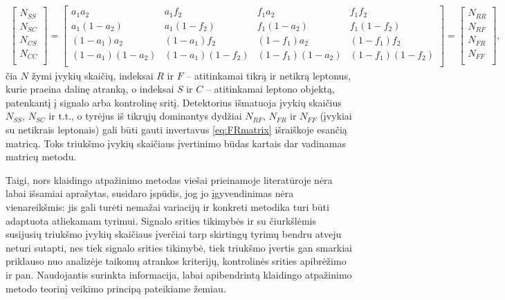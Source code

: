 \documentclass[a4paper, 12pt, oneside]{article}
\newlength\q
\begin{document}
\begin{align}
\label{eq:FRmatrix}
	\begin{bmatrix}
		N_{SS} \\		
		N_{SC} \\
		N_{CS} \\
		N_{CC} \\
	\end{bmatrix}
	=
	\begin{bmatrix}
		a_1a_2 & a_1f_2 & f_1a_2 & f_1f_2 \\
		a_1(1-a_2) & a_1(1-f_2) & f_1(1-a_2) & f_1(1-f_2) \\
		(1-a_1)a_2 & (1-a_1)f_2 & (1-f_1)a_2 & (1-f_1)f_2 \\
		(1-a_1)(1-a_2) & (1-a_1)(1-f_2) & (1-f_1)(1-a_2) & (1-f_1)(1-f_2) \\
	\end{bmatrix}
	=
	\begin{bmatrix}
		N_{RR} \\
		N_{RF} \\
		N_{FR} \\
		N_{FF} \\
	\end{bmatrix}
	\! ,
\end{align}
čia $N$ žymi įvykių skaičių, indeksai $R$ ir $F$ -- atitinkamai tikrą ir netikrą leptonus, kurie praeina dalinę atranką,
o indeksai $S$ ir $C$ -- atitinkamai leptono objektą, patenkantį į signalo arba kontrolinę sritį.
Detektorius išmatuoja įvykių skaičius $N_{SS}$, $N_{SC}$ ir t.t., o tyrėjus iš tikrųjų dominantys dydžiai $N_{RF}$, $N_{FR}$ ir
$N_{FF}$ (įvykiai su netikrais leptonais) gali būti gauti invertavus \eqref{eq:FRmatrix} išraiškoje esančią matricą.
Toks triukšmo įvykių skaičiaus įvertinimo būdas kartais dar vadinamas matricų metodu.

Taigi, nors klaidingo atpažinimo metodas viešai prieinamoje literatūroje nėra labai išsamiai aprašytas, susidaro įspūdis, jog
jo įgyvendinimas nėra vienareikšmis: jis gali turėti nemažai variacijų ir konkreti metodika turi būti adaptuota atliekamam tyrimui.
Signalo srities tikimybės ir su čiurkšlėmis susijusių triukšmo įvykių skaičiaus įverčiai tarp skirtingų tyrimų bendru atveju neturi
sutapti, nes tiek signalo srities tikimybė, tiek triukšmo įvertis gan smarkiai priklauso nuo analizėje taikomų atrankos kriterijų,
kontrolinės srities apibrėžimo ir pan.
Naudojantis surinkta informacija, labai apibendrintą klaidingo atpažinimo metodo teorinį veikimo principą pateikiame žemiau.
\end{document}
